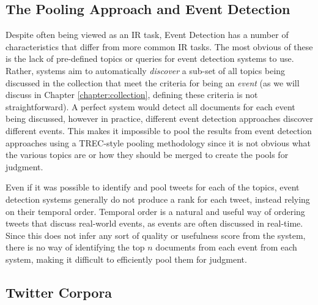 \subsection{The Pooling Approach and Event Detection}
Despite often being viewed as an IR task, Event Detection has a number of characteristics that differ from more common IR tasks.
The most obvious of these is the lack of pre-defined topics or queries for event detection systems to use.
Rather, systems aim to automatically \emph{discover} a sub-set of all topics being discussed in the collection that meet the criteria for being an \emph{event} (as we will discuss in Chapter \ref{chapter:collection}, defining these criteria is not straightforward).
A perfect system would detect all documents for each event being discussed, however in practice, different event detection approaches discover different events.
This makes it impossible to pool the results from event detection approaches using a TREC-style pooling methodology since it is not obvious what the various topics are or how they should be merged to create the pools for judgment.

Even if it was possible to identify and pool tweets for each of the topics, event detection systems generally do not produce a rank for each tweet, instead relying on their temporal order.
Temporal order is a natural and useful way of ordering tweets that discuss real-world events, as events are often discussed in real-time.
Since this does not infer any sort of quality or usefulness score from the system, there is no way of identifying the top $n$ documents from each event from each system, making it difficult to efficiently pool them for judgment.

\subsection{Twitter Corpora}
\label{background:sec:twittercorpora}

